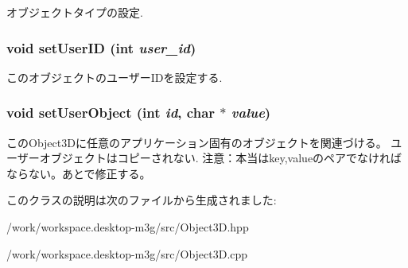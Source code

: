 オブジェクトタイプの設定. \hypertarget{classm3g_1_1Object3D_8eaa86665b4ca2c39691b6efc50108ee}{
\subsubsection[{setUserID}]{\setlength{\rightskip}{0pt plus 5cm}void setUserID (int {\em user\_\-id})}}
\label{classm3g_1_1Object3D_8eaa86665b4ca2c39691b6efc50108ee}


このオブジェクトのユーザーIDを設定する. \hypertarget{classm3g_1_1Object3D_990adc7f146e1b5d229e1d8fc3625a24}{
\subsubsection[{setUserObject}]{\setlength{\rightskip}{0pt plus 5cm}void setUserObject (int {\em id}, \/  char $\ast$ {\em value})}}
\label{classm3g_1_1Object3D_990adc7f146e1b5d229e1d8fc3625a24}


このObject3Dに任意のアプリケーション固有のオブジェクトを関連づける。 ユーザーオブジェクトはコピーされない. 注意：本当はkey,valueのペアでなければならない。あとで修正する。 

このクラスの説明は次のファイルから生成されました:\begin{CompactItemize}
\item 
/work/workspace.desktop-m3g/src/Object3D.hpp\item 
/work/workspace.desktop-m3g/src/Object3D.cpp\end{CompactItemize}
